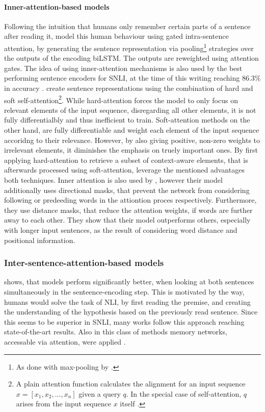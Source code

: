 \paragraph*{Inner-attention-based models}
Following the intuition that humans only remember certain parts of a sentence after reading it, \cite{chen2017recurrent} model this human behaviour using gated intra-sentence attention, by generating the sentence representation via pooling\footnote{As done with max-pooling by \cite{nie2017shortcut}.} strategies over the outputs of the encoding \ac{biLSTM}. The outputs are reweighted using  attention gates. The idea of using inner-attention mechanisms is also used by the best performing sentence encoders for \ac{SNLI}, at the time of this writing reaching 86.3\% in accuracy \citep{shen2018reinforced,im2017distance}. \cite{shen2018reinforced} create sentence representations using the combination of hard and soft self-attention\footnote{A plain attention function calculates the alignment for an input sequence $x=[x_1, x_2, ...,x_n]$ given a query $q$. In the special case of self-attention, $q$ arises from the input sequence $x$ itself \citep{shen2018reinforced}.}. While hard-attention forces the model to only focus on relevant elements of the input sequence, disregarding all other elements, it is not fully differentialbly and thus inefficient to train. Soft-attention methods on the other hand, are fully differentiable and weight each element of the input sequence accoridng to their relevance. However, by also giving positive, non-zero weights to irrelevant elements, it diminishes the emphasis on truely important ones. By first applying hard-attention to retrieve a subset of context-aware elements, that is afterwards processed using soft-attention, \cite{shen2018reinforced} leverage the mentioned advantages both techniques. Inner attention is also used by \cite{im2017distance}, however their model additionally uses directional masks, that prevent the network from considering following or predeeding words in the attiontion proces respectively. Furthermore, they use distance masks, that reduce the attention weights, if words are further away to each other. They show that their model outperforms others, especially with longer input sentences, as the result of considering word distance and positional information.

\subsubsection{Inter-sentence-attention-based models}\label{sec:rel_work_sentence_encoding_models}
\cite{rocktaschel2015reasoning} shows, that models perform significantly better, when looking at both sentences simultaneously in the senteence-encoding step. This is motivated by the way, humans would solve the task of \ac{NLI}, by first reading the premise, and creating the understanding of the hypothesis based on the previously read sentence. Since this seems to be superior in \ac{SNLI}, many works follow this approach reaching state-of-the-art results. Also in this class of methods memory networks, accessable via attention, were applied \citep{cheng2016long}.

